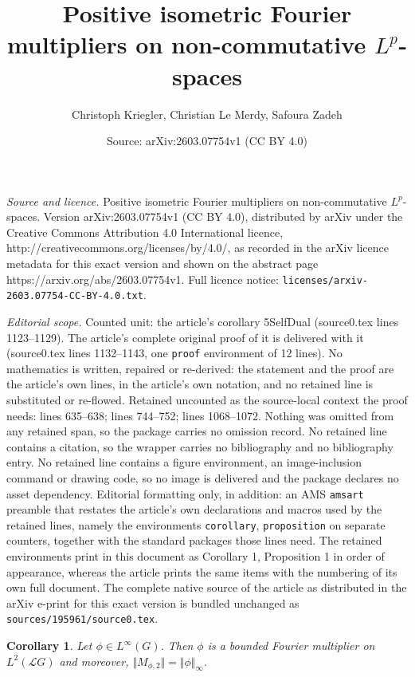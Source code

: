 \documentclass[10pt,a4paper]{amsart}
\title{Positive isometric Fourier multipliers on non-commutative $L^p$-spaces}
\author{Christoph Kriegler, Christian Le Merdy, Safoura Zadeh}
\date{Source: arXiv:2603.07754v1 (CC BY 4.0)}
\newtheorem{corollary}{Corollary}
\newcommand{\norm}[1]{\Vert#1\Vert}
\begin{document}
\maketitle

\noindent\emph{Source and licence.} Positive isometric Fourier multipliers on non-commutative $L^p$-spaces. Version arXiv:2603.07754v1 (CC BY 4.0), distributed by arXiv under the Creative Commons Attribution 4.0 International licence, http://creativecommons.org/licenses/by/4.0/, as recorded in the arXiv licence metadata for this exact version and shown on the abstract page https://arxiv.org/abs/2603.07754v1. Full licence notice: \texttt{licenses/arxiv-2603.07754-CC-BY-4.0.txt}.\par\smallskip

\noindent\textit{Editorial scope.} Counted unit: the article's corollary 5SelfDual (source0.tex lines 1123--1129). The article's complete original proof of it is delivered with it (source0.tex lines 1132--1143, one \texttt{proof} environment of 12 lines). No mathematics is written, repaired or re-derived: the statement and the proof are the article's own lines, in the article's own notation, and no retained line is substituted or re-flowed.  Retained uncounted as the source-local context the proof needs: lines 635--638; lines 744--752; lines 1068--1072.  Nothing was omitted from any retained span, so the package carries no omission record.  No retained line contains a citation, so the wrapper carries no bibliography and no bibliography entry.  No retained line contains a figure environment, an image-inclusion command or drawing code, so no image is delivered and the package declares no asset dependency.  Editorial formatting only, in addition: an AMS \texttt{amsart} preamble that restates the article's own declarations and macros used by the retained lines, namely the environments \texttt{corollary}, \texttt{proposition} on separate counters, together with the standard packages those lines need.  The retained environments print in this document as Corollary 1, Proposition 1 in order of appearance, whereas the article prints the same items with the numbering of its own full document.  The complete native source of the article as distributed in the arXiv e-print for this exact version is bundled unchanged as \texttt{sources/195961/source0.tex}.
\begin{corollary}\label{3Always}
Let $\phi\in L^\infty(G)$. Then $\phi$ is a bounded Fourier multiplier on $L^2({\mathcal L}G)$ and moreover,
$\norm{M_{\phi,2}}= \norm{\phi}_\infty.$
\end{corollary}
\end{document}
